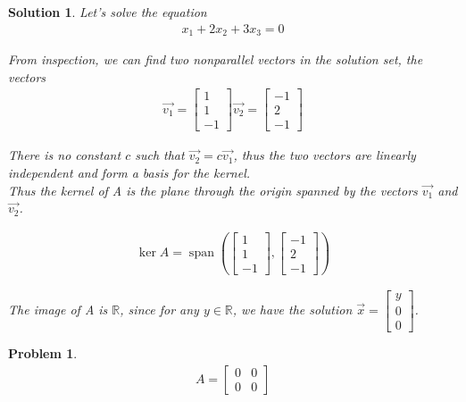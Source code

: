 \documentclass{article}
\newtheorem{problem}{Problem}
\newtheorem*{solution}{Solution}
\DeclareMathOperator{\Span}{span}
\begin{document}
\begin{solution}
Let's solve the equation
\begin{align*}
x_{1} + 2x_{2} + 3x_{3} = 0
\end{align*}

From inspection, we can find two nonparallel vectors in the solution set, the vectors 
\begin{align*}
\vec{v_{1}} = \begin{bmatrix}1 \\ 1 \\ -1\end{bmatrix} \vec{v_{2}} = \begin{bmatrix}-1 \\ 2 \\ -1\end{bmatrix}
\end{align*}

There is no constant $c$ such that $\vec{v_{2}} = c\vec{v_{1}}$, thus the two vectors are linearly independent and form a basis for the kernel. \\

Thus the kernel of A is the plane through the origin spanned by the vectors $\vec{v_{1}}$ and $\vec{v_{2}}$.

\begin{align*}
\ker A = \Span \left( \begin{bmatrix}1 \\ 1 \\ -1\end{bmatrix}, \begin{bmatrix}-1 \\ 2 \\ -1\end{bmatrix} \right)
\end{align*}

The image of A is $\mathbb{R}$, since for any $y \in \mathbb{R}$, we have the solution $\vec{x} = \begin{bmatrix} y \\ 0 \\ 0 \end{bmatrix}$.

\end{solution}

\begin{problem}
\begin{align*}
A = \begin{bmatrix}0 & 0 \\ 0 & 0 \end{bmatrix}
\end{align*}
\end{problem}
\end{document}
